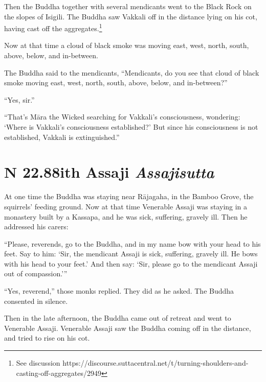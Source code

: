 \documentclass[12pt,openany]{book}%
\newcommand*{\suttatitleacronym}[1]{\smaller[2]{#1}\vspace*{.3em}}
\newcommand*{\suttatitletranslation}[1]{\linebreak{#1}}
\newcommand*{\suttatitleroot}[1]{\linebreak\smaller[2]\itshape{#1}}
\newcommand*{\tocacronym}[1]{\hspace*{-3.3em}{#1}\quad}
\newcommand*{\toctranslation}[1]{#1}
\newcommand*{\tocroot}[1]{(\textit{#1})}
\begin{document}
Then the Buddha together with several mendicants went to the Black Rock on the slopes of Isigili. The Buddha saw Vakkali off in the distance lying on his cot, having cast off the aggregates.\footnote{See discussion https://discourse.suttacentral.net/t/turning-shoulders-and-casting-off-aggregates/2949 } 

Now at that time a cloud of black smoke was moving east, west, north, south, above, below, and in-between. 

The Buddha said to the mendicants, “Mendicants, do you see that cloud of black smoke moving east, west, north, south, above, below, and in-between?” 

“Yes, sir.” 

“That’s \textsanskrit{Māra} the Wicked searching for Vakkali’s consciousness, wondering: ‘Where is Vakkali’s consciousness established?’ But since his consciousness is not established, Vakkali is extinguished.” 

%
\section*{{\suttatitleacronym SN 22.88}{\suttatitletranslation With Assaji }{\suttatitleroot Assajisutta}}
\addcontentsline{toc}{section}{\tocacronym{SN 22.88} \toctranslation{With Assaji } \tocroot{Assajisutta}}

At one time the Buddha was staying near \textsanskrit{Rājagaha}, in the Bamboo Grove, the squirrels’ feeding ground. Now at that time Venerable Assaji was staying in a monastery built by a Kassapa, and he was sick, suffering, gravely ill. Then he addressed his carers: 

“Please, reverends, go to the Buddha, and in my name bow with your head to his feet. Say to him: ‘Sir, the mendicant Assaji is sick, suffering, gravely ill. He bows with his head to your feet.’ And then say: ‘Sir, please go to the mendicant Assaji out of compassion.’” 

“Yes, reverend,” those monks replied. They did as he asked. The Buddha consented in silence. 

Then in the late afternoon, the Buddha came out of retreat and went to Venerable Assaji. Venerable Assaji saw the Buddha coming off in the distance, and tried to rise on his cot. 
\end{document}
